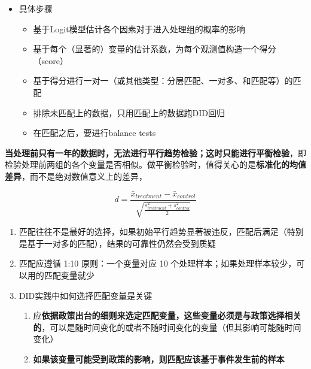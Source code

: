 \documentclass[11pt,a4paper]{ctexart}
\begin{document}
\begin{itemize}
\item
  具体步骤

  \begin{itemize}
  \item
    基于Logit模型估计各个因素对于进入处理组的概率的影响
  \end{itemize}

  \begin{itemize}
  \item
    基于每个（显著的）变量的估计系数，为每个观测值构造一个得分（score）
  \end{itemize}

  \begin{itemize}
  \item
    基于得分进行一对一（或其他类型：分层匹配、一对多、和匹配等）的匹配
  \end{itemize}

  \begin{itemize}
  \item
    排除未匹配上的数据，只用匹配上的数据跑DID回归
  \end{itemize}

  \begin{itemize}
  \item
    在匹配之后，要进行balance tests
  \end{itemize}
\end{itemize}

\textbf{当处理前只有一年的数据时，无法进行平行趋势检验；这时只能进行平衡检验}，即检验处理前两组的各个变量是否相似。做平衡检验时，值得关心的是\textbf{标准化的均值差异}，而不是绝对数值意义上的差异，

\[d=\frac{\bar{ x}_{treatment}-\bar x_{control}}{\sqrt{\frac{s_{treatment}^2+s_{control}^2}{2}}}\]

\begin{enumerate}
\def\labelenumi{\arabic{enumi}.}
\item
  匹配往往不是最好的选择，如果初始平行趋势显著被违反，匹配后满足（特别是基于一对多的匹配），结果的可靠性仍然会受到质疑
\item
  匹配应遵循 1:10 原则：一个变量对应 10
  个处理样本；如果处理样本较少，可以用的匹配变量就少
\item
  DID实践中如何选择匹配变量是关键

  \begin{enumerate}
  \def\labelenumii{\arabic{enumii}.}
  \item
    应\textbf{依据政策出台的细则来选定匹配变量，这些变量必须是与政策选择相关的}，可以是随时间变化的或者不随时间变化的变量（但其影响可能随时间变化）
  \item
    \textbf{如果该变量可能受到政策的影响，则匹配应该基于事件发生前的样本}
  \end{enumerate}
\end{enumerate}
\end{document}

